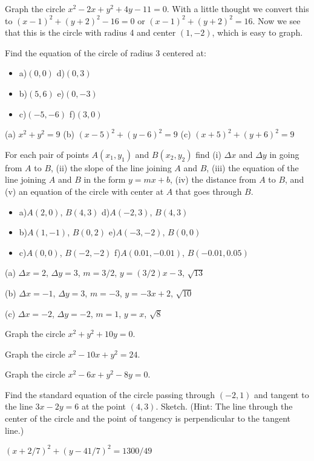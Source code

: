 \begin{example} Graph the circle $x^2-2x+y^2+4y-11=0$. With a little thought
we convert this to $(x-1)^2+(y+2)^2-16=0$ or $(x-1)^2+(y+2)^2=16$.
Now we see that this is the circle with radius 4 and center $(1,-2)$,
which is easy to graph.
\end{example}

\begin{exercises}

\exercise
Find the equation of the circle of radius 3 centered at: 
\begin{itemize} %
\item{a)}{$(0,0)$} {d)}{$(0,3)$}
\item{b)}{$(5,6)$} {e)}{$(0,-3)$}
\item{c)}{$(-5,-6)$} {f)}{$(3,0)$}
\end{itemize}
\begin{answer} (a) $x^2+y^2=9$
{} (b) $(x-5)^2+(y-6)^2=9$
{} (c) $(x+5)^2+(y+6)^2=9$
\end{answer}

\exercise
For each pair of points $A(x_1,y_1)$ and $B(x_2,y_2)$ find (i) $\Delta x$
and $\Delta y$ in going from $A$ to $B$, (ii) the slope of the line joining
$A$ and $B$, (iii) the equation of the line joining $A$ and $B$ in the form
$y=mx+b$, (iv) the distance from $A$ to $B$, and (v) an equation of
the circle with center at $A$ that goes through $B$.

\begin{itemize} %
\item{a)}{$A(2,0)$, $B(4,3)$} {d)}{$A(-2,3)$, $B(4,3)$}
\item{b)}{$A(1,-1)$, $B(0,2)$} {e)}{$A(-3,-2)$, $B(0,0)$} 
\item{c)}{$A(0,0)$, $B(-2,-2)$} {f)}{$A(0.01,-0.01)$, $B(-0.01,0.05)$}
\end{itemize}
\begin{answer} (a) $\Delta x=2$, $\Delta y = 3$, $m=3/2$, $y=(3/2)x-3$, $\sqrt{13}$

{}(b) $\Delta x=-1$, $\Delta y = 3$, $m=-3$, $y=-3x+2$, $\sqrt{10}$

{}(c) $\Delta x=-2$, $\Delta y = -2$, $m=1$, $y=x$, $\sqrt{8}$
\end{answer}

\exercise
Graph the circle $x^2+y^2+10y=0$.

\exercise
Graph the circle $x^2-10x+y^2=24$.

\exercise
Graph the circle $x^2-6x+y^2-8y=0$.

\exercise Find the standard equation of the circle passing through $(-2,1)$
 and tangent to the line $3x-2y =6$ at the point $(4,3)$.  Sketch. 
 (Hint: The line through the center of the circle and the point of tangency
 is perpendicular to the tangent line.)
\begin{answer} $(x+2/7)^2+(y-41/7)^2=1300/49$
\end{answer}

\end{exercises}

